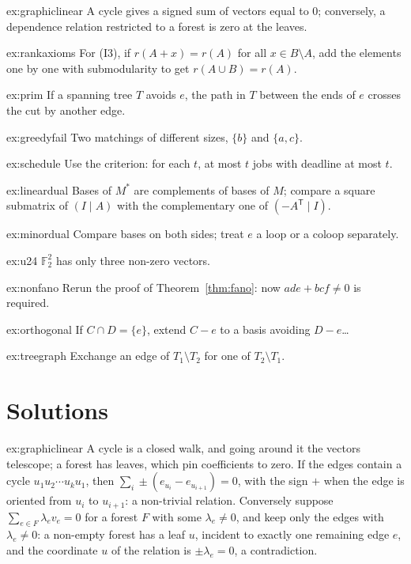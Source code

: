 \begin{hint}{ex:graphiclinear}
A cycle gives a signed sum of vectors equal to $0$; conversely, a dependence relation restricted to a forest is zero at the leaves.
\end{hint}
\begin{hint}{ex:rankaxioms}
For (I3), if $r(A+x)=r(A)$ for all $x\in B\setminus A$, add the elements one by one with submodularity to get $r(A\cup B)=r(A)$.
\end{hint}
\begin{hint}{ex:prim}
If a spanning tree $T$ avoids $e$, the path in $T$ between the ends of $e$ crosses the cut by another edge.
\end{hint}
\begin{hint}{ex:greedyfail}
Two matchings of different sizes, $\{b\}$ and $\{a,c\}$.
\end{hint}
\begin{hint}{ex:schedule}
Use the criterion: for each $t$, at most $t$ jobs with deadline at most $t$.
\end{hint}
\begin{hint}{ex:lineardual}
Bases of $M^*$ are complements of bases of $M$; compare a square submatrix of $(I\mid A)$ with the complementary one of $(-A^{\mathsf T}\mid I)$.
\end{hint}
\begin{hint}{ex:minordual}
Compare bases on both sides; treat $e$ a loop or a coloop separately.
\end{hint}
\begin{hint}{ex:u24}
$\mathbb F_2^2$ has only three non-zero vectors.
\end{hint}
\begin{hint}{ex:nonfano}
Rerun the proof of Theorem~\ref{thm:fano}: now $ade+bcf\ne0$ is required.
\end{hint}
\begin{hint}{ex:orthogonal}
If $C\cap D=\{e\}$, extend $C-e$ to a basis avoiding $D-e$\dots
\end{hint}
\begin{hint}{ex:treegraph}
Exchange an edge of $T_1\setminus T_2$ for one of $T_2\setminus T_1$.
\end{hint}

\section{Solutions}

\begin{solution}{ex:graphiclinear}
\idea A cycle is a closed walk, and going around it the vectors telescope; a forest has leaves, which pin coefficients to zero.
\writeup If the edges contain a cycle $u_1u_2\cdots u_ku_1$, then $\sum_i\pm(e_{u_i}-e_{u_{i+1}})=0$, with the sign $+$ when the edge is oriented from $u_i$ to $u_{i+1}$: a non-trivial relation. Conversely suppose
$\sum_{e\in F}\lambda_ev_e=0$ for a forest $F$ with some $\lambda_e\ne0$, and keep only the edges with $\lambda_e\ne0$: a non-empty forest has a leaf $u$, incident to exactly one remaining edge $e$, and the coordinate $u$ of the relation
is $\pm\lambda_e=0$, a contradiction.
\end{solution}

